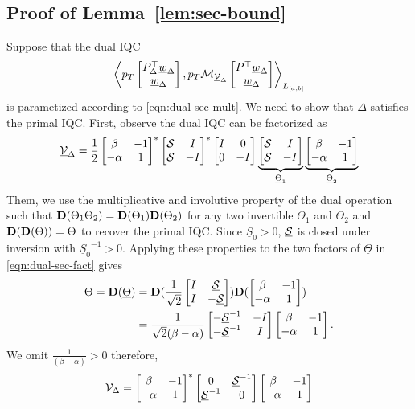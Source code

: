 
\subsection{Proof of Lemma~\ref{lem:sec-bound}}
\label{proof:sec-bound}
Suppose that the dual IQC
\begin{equation*}
     \left\langle p_T\begin{bmatrix}P_\Delta^\top\underline{w}_\Delta \\ \underline{w}_\Delta\end{bmatrix}, p_T \mathcal{M}_{\underline{\mathcal{V}}_\Delta}\begin{bmatrix}P^\top\underline{w}_\Delta \\ \underline{w}_\Delta\end{bmatrix} \right\rangle_{L_{[a,b]}}
\end{equation*}
is parametized according to \eqref{eqn:dual-sec-mult}. We need to show that $\Delta$ satisfies the primal IQC.
First, observe the dual IQC can be factorized as
\begin{equation}\label{eqn:dual-sec-fact}
    \underline{\mathcal{V}}_\Delta = \frac{1}{2}\begin{bmatrix}\beta & -1\\ -\alpha & 1\end{bmatrix}^*
    \begin{bmatrix}\mathcal{S} & I \\ \mathcal{S} & -I\end{bmatrix}^*\begin{bmatrix}I & 0 \\ 0 & -I\end{bmatrix}\underbrace{\begin{bmatrix}\mathcal{S} & I \\ \mathcal{S} & -I\end{bmatrix}}_{\underline{\Theta}_1}\underbrace{\begin{bmatrix}\beta & -1\\ -\alpha & 1\end{bmatrix}}_{\underline{\Theta}_2}
\end{equation}
Them, we use the multiplicative and involutive property of the dual operation such that $\mathbf{D}(\Theta_1\Theta_2)=\mathbf{D}(\Theta_1)\mathbf{D}(\Theta_2)$
for any two invertible $\Theta_1$ and $\Theta_2$  and $\mathbf{D}(\mathbf{D}(\Theta))=\Theta$ to recover the primal IQC.
Since $\underline{S}_0> 0$, $\underline{\mathcal{S}}$ is closed under inversion with ${\underline{S}_0}^{-1}> 0$. 
Applying these properties to the two factors of $\underline{\Theta}$ in \eqref{eqn:dual-sec-fact} gives
\begin{align*}
\Theta = \mathbf{D}(\underline{\Theta})
&=\mathbf{D}(
\frac{1}{\sqrt{2}}
\begin{bmatrix}I&\underline{\mathcal{S}}\\I&-\underline{\mathcal{S}}\end{bmatrix}
)
\mathbf{D}(
\begin{bmatrix}\beta&-1\\-\alpha &1\end{bmatrix}
)\\
&=\frac{1}{\sqrt{2}(\beta-\alpha)}
\begin{bmatrix}-\underline{\mathcal{S}}^{-1}&-I\\-\underline{\mathcal{S}}^{-1}&I\end{bmatrix}
\begin{bmatrix}\beta &-1\\-\alpha&1\end{bmatrix}.
\end{align*}
We omit $\frac{1}{(\beta - \alpha)}>0$ therefore,
\begin{align*}
{\mathcal{V}}_\Delta = \begin{bmatrix}\beta&-1\\-\alpha &1\end{bmatrix}^*
\begin{bmatrix}0&\underline{\mathcal{S}}^{-1}\\\underline{\mathcal{S}}^{-1}&0\end{bmatrix}
\begin{bmatrix}\beta &-1\\-\alpha &1\end{bmatrix}
\end{align*}
